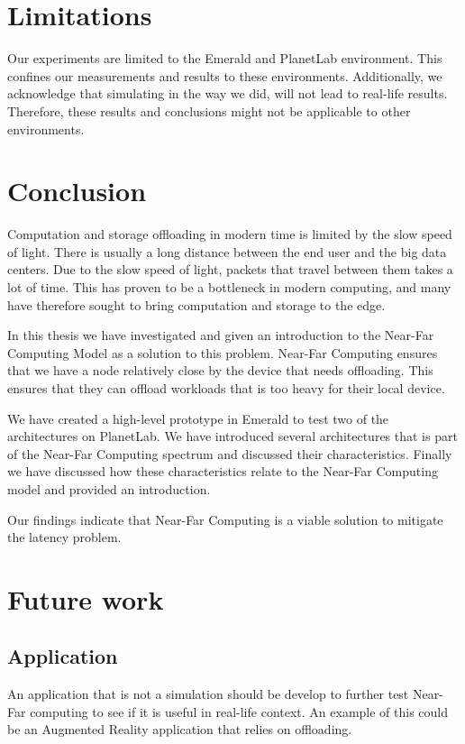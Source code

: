 \section{Limitations}
Our experiments are limited to the Emerald and PlanetLab environment. This confines our measurements and results to these environments. Additionally, we acknowledge that simulating in the way we did, will not lead to real-life results. Therefore, these results and conclusions might not be applicable to other environments.


\section{Conclusion}
Computation and storage offloading in modern time is limited by the slow speed of light. There is usually a long distance between the end user and the big data centers. Due to the slow speed of light, packets that travel between them takes a lot of time. This has proven to be a bottleneck in modern computing, and many have therefore sought to bring computation and storage to the edge. 

In this thesis we have investigated and given an introduction to the Near-Far Computing Model as a solution to this problem. Near-Far Computing ensures that we have a node relatively close by the device that needs offloading. This ensures that they can offload workloads that is too heavy for their local device. 

We have created a high-level prototype in Emerald to test two of the architectures on PlanetLab. We have introduced several architectures that is part of the Near-Far Computing spectrum and discussed their characteristics. Finally we have discussed how these characteristics relate to the Near-Far Computing model and provided an introduction.

Our findings indicate that Near-Far Computing is a viable solution to mitigate the latency problem. 




\section{Future work}
\subsection{Application}
An application that is not a simulation should be develop to further test Near-Far computing to see if it is useful in real-life context. An example of this could be an Augmented Reality application that relies on offloading. 

